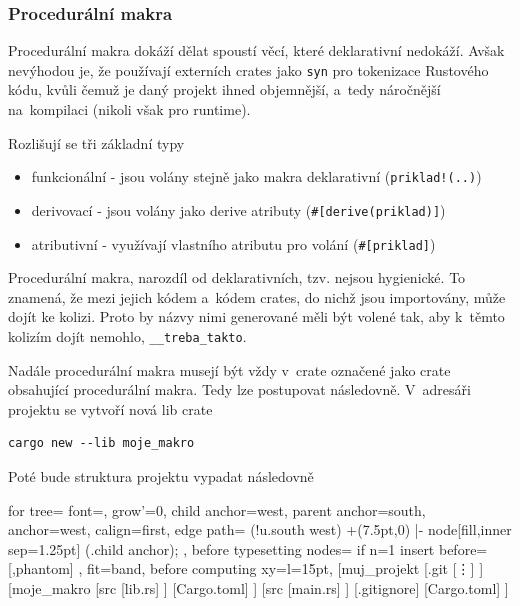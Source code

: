 \documentclass[a4paper, 12pt]{article} %
\newcommand{\rust}[1]{\texttt{#1}}
\begin{document}
		\subsubsection*{Procedurální makra}
			Procedurální makra dokáží dělat spoustí věcí, které deklarativní nedokáží. Avšak nevýhodou je, že používají externích crates jako \rust{syn} pro tokenizace Rustového kódu, kvůli čemuž je daný projekt ihned objemnější, a~tedy náročnější na~kompilaci (nikoli však pro runtime).
			
			Rozlišují se tři základní typy
			\begin{itemize}
				\item funkcionální - jsou volány stejně jako makra deklarativní (\texttt{priklad!(..)})
				\item derivovací - jsou volány jako derive atributy (\texttt{\#[derive(priklad)]})
				\item atributivní - využívají vlastního atributu pro volání (\texttt{\#[priklad]})
			\end{itemize}
			
			Procedurální makra, narozdíl od deklarativních, tzv. nejsou hygienické. To znamená, že mezi jejich kódem a~kódem crates, do nichž jsou importovány, může dojít ke kolizi. Proto by názvy nimi generované měli být volené tak, aby k~těmto kolizím dojít nemohlo, \rust{__treba_takto}.
			
			Nadále procedurální makra musejí být vždy v~crate označené jako crate obsahující procedurální makra. Tedy lze postupovat následovně. V~adresáři projektu se vytvoří nová lib crate
			\begin{verbatim}
cargo new --lib moje_makro
			\end{verbatim}
			
			Poté bude struktura projektu vypadat následovně
			\begin{center}
				\begin{forest}
					for tree={
					font=\ttfamily,
					grow'=0,
					child anchor=west,
					parent anchor=south,
					anchor=west,
					calign=first,
					edge path={
						\noexpand{}
						(!u.south west) +(7.5pt,0) |- node[fill,inner sep=1.25pt] {} (.child anchor);
					},
					before typesetting nodes={
						if n=1
						{insert before={[,phantom]}}
						{}
					},
					fit=band,
					before computing xy={l=15pt},
					}
				[muj\_projekt
					[.git
					[\vdots]
					]
					[moje\_makro
					[src
						[lib.rs]
					]
					[Cargo.toml]
					]
					[src
					[main.rs]
					]
					[.gitignore]
					[Cargo.toml]
				]
				\end{forest}
			\end{center}
			
\end{document}
